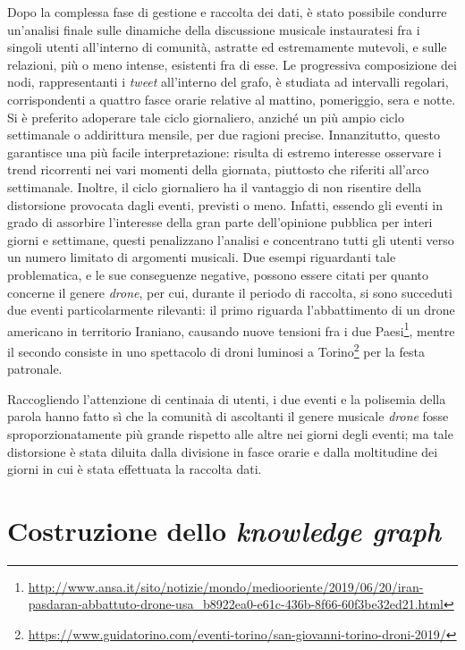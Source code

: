 \documentclass[12pt, a4paper, twocolumn]{article} %
\begin{document}
Dopo la complessa fase di gestione e raccolta dei dati, è stato possibile condurre un'analisi finale sulle dinamiche della discussione musicale instauratesi fra i singoli utenti all'interno di comunità, astratte ed estremamente mutevoli, e sulle relazioni, più o meno intense, esistenti fra di esse.
Le progressiva composizione  dei nodi, rappresentanti i \textit{tweet} all'interno del grafo, è studiata ad intervalli regolari, corrispondenti a quattro fasce orarie relative al mattino, pomeriggio, sera e notte.
Si è preferito adoperare tale ciclo giornaliero, anziché un più ampio ciclo settimanale o addirittura mensile, per due ragioni precise.
Innanzitutto, questo garantisce una più facile interpretazione: risulta di estremo interesse osservare i trend ricorrenti nei vari momenti della giornata, piuttosto che riferiti all'arco settimanale.
Inoltre, il ciclo giornaliero ha il vantaggio di non risentire della distorsione provocata dagli eventi, previsti o meno.
Infatti, essendo gli eventi in grado di assorbire l'interesse della gran parte dell'opinione pubblica per interi giorni e settimane, questi penalizzano l'analisi e concentrano tutti gli utenti verso un numero limitato di argomenti musicali.
Due esempi riguardanti tale problematica, e le sue conseguenze negative, possono essere citati per quanto concerne il genere \textit{drone}, per cui, durante il periodo di raccolta, si sono succeduti due eventi particolarmente rilevanti: il primo riguarda l'abbattimento di un drone americano in territorio Iraniano, causando nuove tensioni fra i due Paesi\footnote{\url{http://www.ansa.it/sito/notizie/mondo/mediooriente/2019/06/20/iran-pasdaran-abbattuto-drone-usa_b8922ea0-e61c-436b-8f66-60f3be32ed21.html}}, mentre il secondo consiste in uno spettacolo di droni luminosi a Torino\footnote{\url{https://www.guidatorino.com/eventi-torino/san-giovanni-torino-droni-2019/}} per la festa patronale.

Raccogliendo l'attenzione di centinaia di utenti, i due eventi e la polisemia della parola hanno fatto sì che la comunità di ascoltanti il genere musicale \textit{drone} fosse sproporzionatamente più grande rispetto alle altre nei giorni degli eventi; ma tale distorsione è stata diluita dalla divisione in fasce orarie e dalla moltitudine dei giorni in cui è stata effettuata la raccolta dati.
\hfill
\newpage


\part{Costruzione dello \textit{knowledge graph}}
\end{document}
